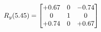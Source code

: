 \documentclass[preview]{standalone}
\begin{document}
\begin{align*}
\special{dvisvgm:raw <g id='unique000'>}R_{y}(5.45) = \begin{bmatrix}+0.67 & 0 & -0.74 \\0 & 1 & 0 \\+0.74 & 0 & +0.67\end{bmatrix}\special{dvisvgm:raw </g>}
\end{align*}
\end{document}
